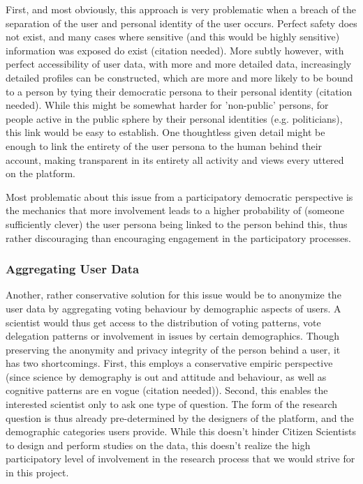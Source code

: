 First, and most obviously, this approach is very problematic when a breach of the separation of the user and personal identity of the user occurs. Perfect safety does not exist, and many cases where sensitive (and this would be highly sensitive) information was exposed do exist (citation needed). More subtly however, with perfect accessibility of user data, with more and more detailed data, increasingly detailed profiles can be constructed, which are more and more likely to be bound to a person by tying their democratic persona to their personal identity (citation needed). While this might be somewhat harder for 'non-public' persons, for people active in the public sphere by their personal identities (e.g. politicians), this link would be easy to establish. One thoughtless given detail might be enough to link the entirety of the user persona to the human behind their account, making transparent in its entirety all activity and views every uttered on the platform. 

Most problematic about this issue from a participatory democratic perspective is the mechanics that more involvement leads to a higher probability of (someone sufficiently clever) the user persona being linked to the person behind this, thus rather discouraging than encouraging engagement in the participatory processes.

\subsubsection{Aggregating User Data}

Another, rather conservative solution for this issue would be to anonymize the user data by aggregating voting behaviour by demographic aspects of users. A scientist would thus get access to the distribution of voting patterns, vote delegation patterns or involvement in issues by certain demographics. Though preserving the anonymity and privacy integrity of the person behind a user, it has two shortcomings. First, this employs a conservative empiric perspective (since science by demography is out and attitude and behaviour, as well as cognitive patterns are en vogue (citation needed)). Second, this enables the interested scientist only to ask one type of question. The form of the research question is thus already pre-determined by the designers of the platform, and the demographic categories users provide. While this doesn't hinder Citizen Scientists to design and perform studies on the data, this doesn't realize the high participatory level of involvement in the research process that we would strive for in this project.

